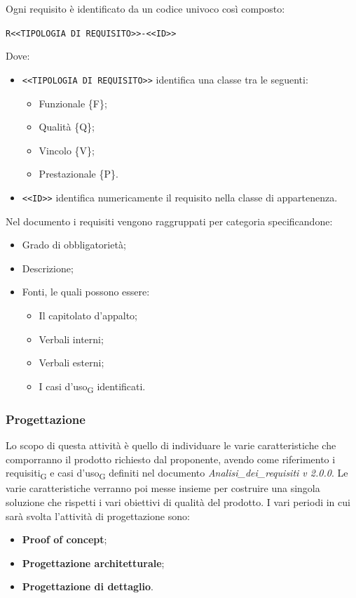     Ogni requisito è identificato da un codice univoco così composto:
    \begin{center}
		\verb|R<<TIPOLOGIA DI REQUISITO>>-<<ID>>|
    \end{center}
    Dove:
    \begin{itemize}
        \item \verb|<<TIPOLOGIA DI REQUISITO>>| identifica una classe tra le seguenti:
        \begin{itemize}
            \item Funzionale \{F\};
            \item Qualità \{Q\};
            \item Vincolo \{V\};
            \item Prestazionale \{P\}.
        \end{itemize}
        \item \verb|<<ID>>| identifica numericamente il requisito nella classe di appartenenza.
    \end{itemize}
    Nel documento i requisiti vengono raggruppati per categoria specificandone:
    \begin{itemize}
        \item Grado di obbligatorietà;
        \item Descrizione;
        \item Fonti, le quali possono essere:
        \begin{itemize}
        	\item Il capitolato d'appalto;
        	\item Verbali interni;
        	\item Verbali esterni;
        	\item I casi d'uso\textsubscript{G} identificati.
        \end{itemize}
    \end{itemize}
	
	
	\subsubsection{Progettazione}
	Lo scopo di questa attività è quello di individuare le varie caratteristiche che comporranno il prodotto richiesto dal proponente, avendo come riferimento i requisiti\textsubscript{G} e casi d'uso\textsubscript{G} definiti nel documento \textit{Analisi\_dei\_requisiti v 2.0.0}. Le varie caratteristiche verranno poi messe insieme per costruire una singola soluzione che rispetti i vari obiettivi di qualità del prodotto.
	I vari periodi in cui sarà svolta l'attività di progettazione sono:
	\begin{itemize}
		\item \textbf{Proof of concept};
		\item \textbf{Progettazione architetturale};
		\item \textbf{Progettazione di dettaglio}.
	\end{itemize}
